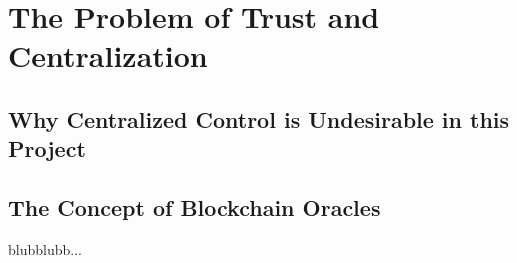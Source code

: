  \chapter{The Problem of Trust and Centralization}
 \label{cha:trust_and_centralization}
 \section{Why Centralized Control is Undesirable in this Project}
 
 \section{The Concept of Blockchain Oracles}
 blubblubb...
